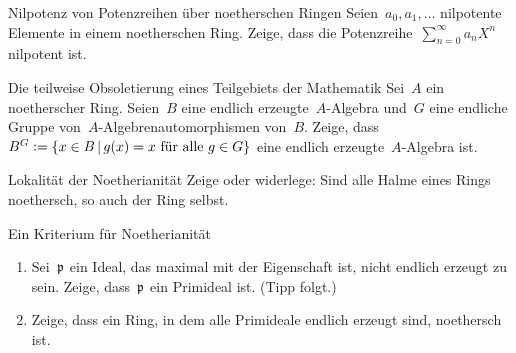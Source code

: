 \documentclass[entwurf]{uebblatt}
\begin{document}

\begin{aufgabe}{}{Nilpotenz von Potenzreihen über noetherschen Ringen}
Seien~$a_0, a_1, \ldots$ nilpotente Elemente in einem noetherschen Ring. Zeige,
dass die Potenzreihe~$\sum_{n=0}^\infty a_n X^n$ nilpotent ist.
\end{aufgabe}

\begin{aufgabe}{}{Die teilweise Obsoletierung eines Teilgebiets der Mathematik}
Sei~$A$ ein noetherscher Ring. Seien~$B$ eine
endlich erzeugte~$A$-Algebra und~$G$ eine endliche Gruppe von~$A$-Algebrenautomorphismen
von~$B$. Zeige, dass~$B^G \vcentcolon= \{x \in B \,|\, \text{$g(x) = x$ für alle~$g
\in G$} \}$ eine endlich erzeugte~$A$-Algebra ist.
\end{aufgabe}

\begin{aufgabe}{}{Lokalität der Noetherianität}
Zeige oder widerlege: Sind alle Halme eines Rings noethersch, so auch der Ring
selbst.
\end{aufgabe}

\begin{aufgabe}{}{Ein Kriterium für Noetherianität}
\begin{enumerate}
\item Sei~$\mathfrak{p}$ ein Ideal, das maximal mit der Eigenschaft ist,
nicht endlich erzeugt zu sein. Zeige, dass~$\mathfrak{p}$ ein Primideal ist.
(Tipp folgt.)
\item Zeige, dass ein Ring, in dem alle Primideale endlich erzeugt sind,
noethersch ist.
\end{enumerate}
\end{aufgabe}
\end{document}
